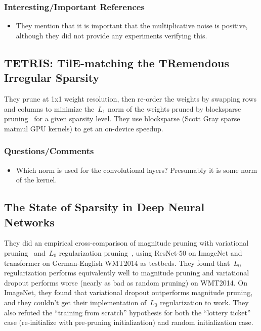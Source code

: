 \documentclass[a4paper, 12pt]{article}
\begin{document}
\subsubsection{Interesting/Important References}

\begin{itemize}
        \item They mention that it is important that the multiplicative noise
                is positive, although they did not provide any experiments
                verifying this.
\end{itemize}


\subsection{TETRIS: TilE-matching the TRemendous Irregular
            Sparsity~\cite{yu2018tetris}}

They prune at 1x1 weight resolution, then re-order the weights by swapping rows
and columns to minimize the~$L_1$ norm of the weights pruned by blocksparse
pruning~\cite{wen2016learning} for a given sparsity level. They use blocksparse
(Scott Gray sparse matmul GPU kernels) to get an on-device speedup.

\subsubsection{Questions/Comments}

\begin{itemize}
        \item Which norm is used for the convolutional layers? Presumably it is
                some norm of the kernel.
\end{itemize}


\subsection{The State of Sparsity in Deep Neural
            Networks~\cite{gale2019thestate}}

They did an empirical cross-comparison of magnitude pruning with variational
pruning~\cite{molchanov2017variational} and~$L_0$ regularization
pruning~\cite{louizos2018learning}, using ResNet-50 on ImageNet and transformer
on German-English WMT2014 as testbeds.
They found that~$L_0$ regularization performs equivalently well to magnitude
pruning and variational dropout performs worse (nearly as bad as random
pruning) on WMT2014.
On ImageNet, they found that variational dropout outperforms magnitude pruning,
and they couldn't get their implementation of~$L_0$ regularization to work.
They also refuted the ``training from scratch'' hypothesis for both the
``lottery ticket'' case (re-initialize with pre-pruning initialization) and
random initialization case.
\end{document}
